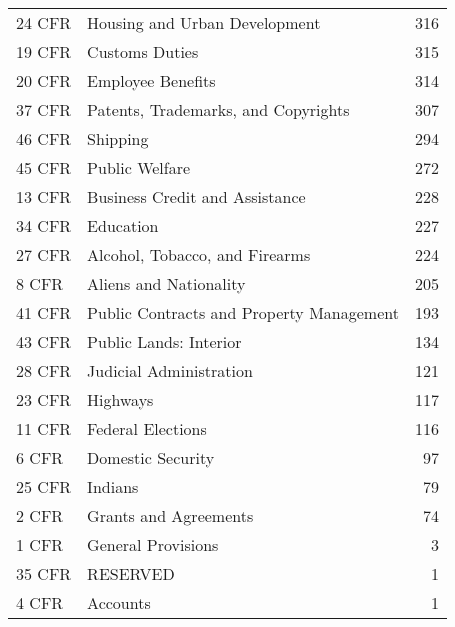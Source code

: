 \documentclass{article}
\begin{document}
\begin{table}[ht]
\begin{tabular}{llr}
  24 CFR & Housing and Urban Development & 316 \\ 
  19 CFR & Customs Duties & 315 \\ 
  20 CFR & Employee Benefits & 314 \\ 
  37 CFR & Patents, Trademarks, and Copyrights& 307 \\ 
  46 CFR & Shipping & 294 \\ 
  45 CFR & Public Welfare & 272 \\ 
  13 CFR & Business Credit and Assistance & 228 \\ 
  34 CFR & Education & 227 \\ 
  27 CFR & Alcohol, Tobacco, and Firearms & 224 \\ 
  8 CFR & Aliens and Nationality & 205 \\ 
  41 CFR & Public Contracts and Property Management & 193 \\ 
  43 CFR & Public Lands: Interior & 134 \\ 
  28 CFR & Judicial Administration & 121 \\ 
  23 CFR & Highways & 117 \\ 
  11 CFR & Federal Elections & 116 \\ 
  6 CFR & Domestic Security &  97 \\ 
  25 CFR & Indians &  79 \\ 
  2 CFR & Grants and Agreements &  74 \\ 
  1 CFR & General Provisions &   3 \\ 
  35 CFR & RESERVED &   1 \\ 
  4 CFR & Accounts &   1 \\ 
   \hline
\end{tabular}
\end{table}
\end{document}
